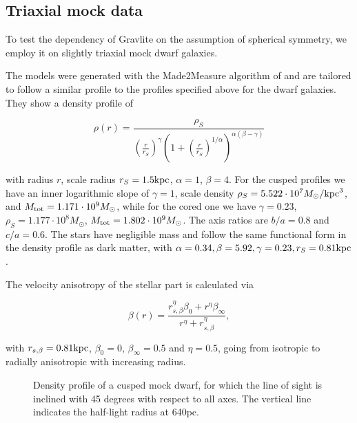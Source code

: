 \subsection{Triaxial mock data}

To test the dependency of {\sc Gravlite} on the
assumption of spherical symmetry, we employ it on
slightly triaxial mock dwarf galaxies.

The models were generated with the Made2Measure
algorithm of \cite{Dehnen2009} and are tailored to
follow a similar profile to the profiles specified
above for the dwarf galaxies. They show a density
profile of

\begin{equation}
    \rho(r)=\frac{\rho_S}{\left(\frac{r}{r_S}\right)^\gamma\left(1+\left(\frac{r}{r_S}\right)^{1/\alpha}\right)^{\alpha(\beta-\gamma)}}
\end{equation}

with radius $r$, scale radius $r_S=1.5\mathrm{kpc}$,
$\alpha=1$, $\beta=4$. For the cusped profiles we
have an inner logarithmic slope of $\gamma=1$,
scale density $\rho_S=5.522\cdot
10^7M_\odot/\mathrm{kpc}^3$, and
$M_{\mathrm{tot}}=1.171\cdot10^9M_\odot$, while for the
cored one we have $\gamma=0.23$,
$\rho_S=1.177\cdot10^8M_\odot$,
$M_{\mathrm{tot}}=1.802\cdot10^9M_\odot$. The axis ratios
are $b/a=0.8$ and $c/a=0.6$. The stars have
negligible mass and follow the same functional
form in the density profile as dark matter, with
$\alpha=0.34, \beta=5.92, \gamma=0.23,
r_S=0.81\mathrm{kpc}$.

The velocity anisotropy of the stellar part is calculated via

\begin{equation}
    \beta(r)=\frac{r_{s,\beta}^\eta \beta_0+r^\eta \beta_\infty}{r^\eta+r_{s,\beta}^\eta},
\end{equation}

with $r_{s,\beta}=0.81\mathrm{kpc}$, $\beta_0=0$, $\beta_\infty=0.5$ and
$\eta=0.5$, going from isotropic to radially anisotropic with
increasing radius.

\begin{figure*}
    \begin{center}
        \hspace{-7mm}
        \caption{Density profile of a cusped
           mock dwarf, for which the line
          of sight is inclined with 45 degrees
          with respect to all axes. The vertical
          line indicates the half-light radius at
          640pc.}
        \label{fig:triax}
    \end{center}
\end{figure*}

